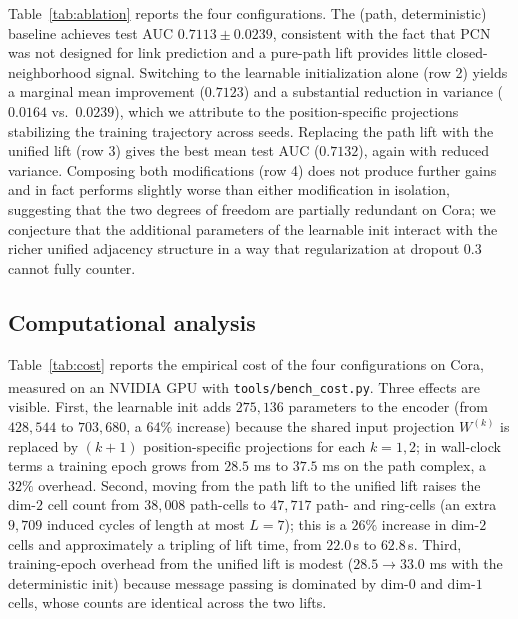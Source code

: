 \documentclass{article}
\begin{document}
Table~\ref{tab:ablation} reports the four configurations. The (path, deterministic) baseline achieves test AUC $0.7113 \pm 0.0239$, consistent with the fact that PCN was not designed for link prediction and a pure-path lift provides little closed-neighborhood signal. Switching to the learnable initialization alone (row 2) yields a marginal mean improvement ($0.7123$) and a substantial reduction in variance ($0.0164$ vs.\ $0.0239$), which we attribute to the position-specific projections stabilizing the training trajectory across seeds. Replacing the path lift with the unified lift (row 3) gives the best mean test AUC ($0.7132$), again with reduced variance. Composing both modifications (row 4) does not produce further gains and in fact performs slightly worse than either modification in isolation, suggesting that the two degrees of freedom are partially redundant on Cora; we conjecture that the additional parameters of the learnable init interact with the richer unified adjacency structure in a way that regularization at dropout $0.3$ cannot fully counter.

\subsection{Computational analysis}
\label{subsec:cost}
Table~\ref{tab:cost} reports the empirical cost of the four configurations on Cora, measured on an NVIDIA\textsuperscript{\textregistered} GPU with \texttt{tools/bench\_cost.py}. Three effects are visible. First, the learnable init adds $275{,}136$ parameters to the encoder (from $428{,}544$ to $703{,}680$, a $64\%$ increase) because the shared input projection $W^{(k)}$ is replaced by $(k + 1)$ position-specific projections for each $k = 1, 2$; in wall-clock terms a training epoch grows from $28.5$ ms to $37.5$ ms on the path complex, a $32\%$ overhead. Second, moving from the path lift to the unified lift raises the dim-$2$ cell count from $38{,}008$ path-cells to $47{,}717$ path- and ring-cells (an extra $9{,}709$ induced cycles of length at most $L = 7$); this is a $26\%$ increase in dim-$2$ cells and approximately a tripling of lift time, from $22.0$\,s to $62.8$\,s. Third, training-epoch overhead from the unified lift is modest ($28.5 \to 33.0$ ms with the deterministic init) because message passing is dominated by dim-$0$ and dim-$1$ cells, whose counts are identical across the two lifts.
\end{document}
